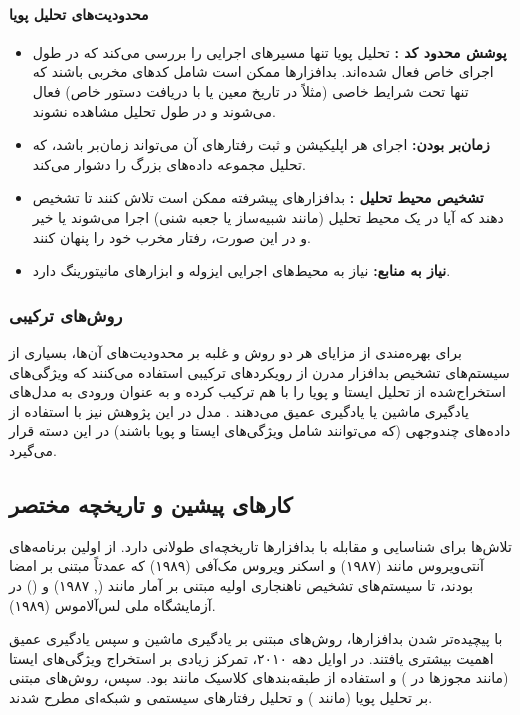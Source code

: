 \paragraph{محدودیت‌های تحلیل پویا}
\begin{itemize}
    \item \textbf{پوشش محدود کد :} تحلیل پویا تنها مسیرهای اجرایی را بررسی می‌کند که در طول اجرای خاص فعال شده‌اند. بدافزارها ممکن است شامل کدهای مخربی باشند که تنها تحت شرایط خاصی (مثلاً در تاریخ معین یا با دریافت دستور خاص) فعال می‌شوند و در طول تحلیل مشاهده نشوند.
    \item \textbf{زمان‌بر بودن:} اجرای هر اپلیکیشن و ثبت رفتارهای آن می‌تواند زمان‌بر باشد، که تحلیل مجموعه داده‌های بزرگ را دشوار می‌کند.
    \item \textbf{تشخیص محیط تحلیل :} بدافزارهای پیشرفته ممکن است تلاش کنند تا تشخیص دهند که آیا در یک محیط تحلیل (مانند شبیه‌ساز یا جعبه شنی) اجرا می‌شوند یا خیر و در این صورت، رفتار مخرب خود را پنهان کنند.
    \item \textbf{نیاز به منابع:} نیاز به محیط‌های اجرایی ایزوله و ابزارهای مانیتورینگ دارد.
\end{itemize}

\subsubsection{روش‌های ترکیبی }
برای بهره‌مندی از مزایای هر دو روش و غلبه بر محدودیت‌های آن‌ها، بسیاری از سیستم‌های تشخیص بدافزار مدرن از رویکردهای ترکیبی استفاده می‌کنند که ویژگی‌های استخراج‌شده از تحلیل ایستا و پویا را با هم ترکیب کرده و به عنوان ورودی به مدل‌های یادگیری ماشین یا یادگیری عمیق می‌دهند \cite{DeepLearningMalware}. مدل  در این پژوهش نیز با استفاده از داده‌های چندوجهی (که می‌توانند شامل ویژگی‌های ایستا و پویا باشند) در این دسته قرار می‌گیرد.

\subsection{کارهای پیشین و تاریخچه مختصر}
تلاش‌ها برای شناسایی و مقابله با بدافزارها تاریخچه‌ای طولانی دارد. از اولین برنامه‌های آنتی‌ویروس مانند  (۱۹۸۷) و اسکنر ویروس مک‌آفی (۱۹۸۹) که عمدتاً مبتنی بر امضا بودند، تا سیستم‌های تشخیص ناهنجاری اولیه مبتنی بر آمار مانند  (, ۱۹۸۷) و  () در آزمایشگاه ملی لس‌آلاموس (۱۹۸۹).

با پیچیده‌تر شدن بدافزارها، روش‌های مبتنی بر یادگیری ماشین و سپس یادگیری عمیق اهمیت بیشتری یافتند. در اوایل دهه ۲۰۱۰، تمرکز زیادی بر استخراج ویژگی‌های ایستا (مانند مجوزها در  \cite{Drebin}) و استفاده از طبقه‌بندهای کلاسیک مانند  بود. سپس، روش‌های مبتنی بر تحلیل پویا (مانند  \cite{TaintDroid}) و تحلیل رفتارهای سیستمی و شبکه‌ای مطرح شدند.

